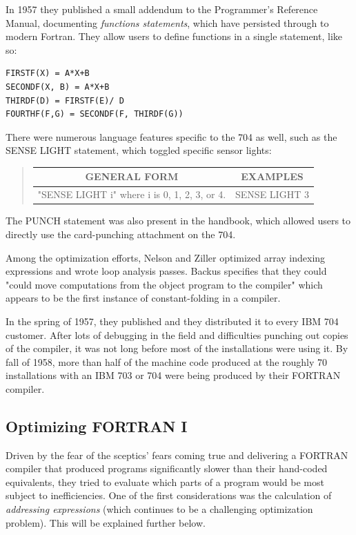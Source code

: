 In 1957 they published a small addendum to the Programmer's Reference Manual,
documenting \textit{functions statements}, which have persisted through to modern Fortran.
They allow users to define functions in a single statement, like so:

\begin{lstlisting}
FIRSTF(X) = A*X+B
SECONDF(X, B) = A*X+B
THIRDF(D) = FIRSTF(E)/ D
FOURTHF(F,G) = SECONDF(F, THIRDF(G))
\end{lstlisting}

There were numerous language features specific to the 704 as well,
such as the SENSE LIGHT statement, which toggled specific sensor lights:

\begin{quotation}
	\begin{tabular}{|c|c|}
		\hline
		GENERAL FORM                                 & EXAMPLES      \\
		\hline
		"SENSE LIGHT i" where i is 0, 1, 2, 3, or 4. & SENSE LIGHT 3 \\
		\hline
	\end{tabular}
\end{quotation}

The PUNCH statement was also present in the handbook, which allowed users to
directly use the card-punching attachment on the 704.

Among the optimization efforts, Nelson and Ziller optimized array indexing expressions and
wrote loop analysis passes.
Backus specifies that they could "could move computations from the object
program to the compiler" which appears to be the first instance of
\gls{constant-folding} in a compiler.

In the spring of 1957, they published 
and they distributed it to every IBM 704 customer.
After lots of debugging in the field and difficulties punching out copies
of the compiler, it was not long before most of the installations were using it.
By fall of 1958, more than half of the machine code produced at the roughly 70 installations
with an IBM 703 or 704 were being produced by their FORTRAN compiler.

\subsection{Optimizing FORTRAN I}

Driven by the fear of the sceptics' fears coming true and delivering a FORTRAN compiler
that produced programs significantly slower than their hand-coded equivalents,
they tried to evaluate which parts of a program would be most subject to inefficiencies.
One of the first considerations was the calculation of \textit{addressing expressions}
\cite{backus_heising_fortran_1964}
(which continues to be a challenging optimization problem).
This will be explained further below.

